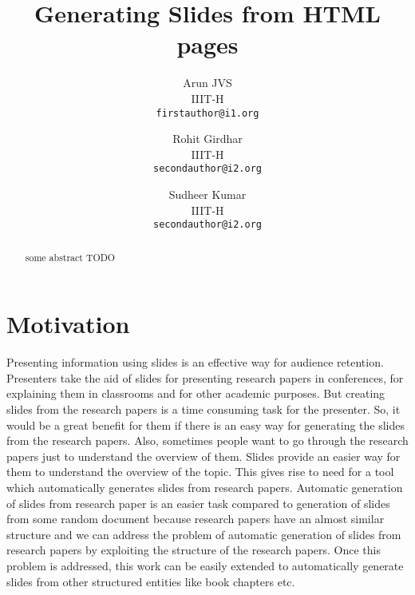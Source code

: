 \documentclass[10pt,twocolumn,letterpaper]{article}
\begin{document}
\title{Generating Slides from HTML pages}

\author{Arun JVS\\
IIIT-H\\
{\tt\small firstauthor@i1.org}
\and
Rohit Girdhar\\
IIIT-H\\
{\tt\small secondauthor@i2.org}
\and
Sudheer Kumar\\
IIIT-H\\
{\tt\small secondauthor@i2.org}
}

\maketitle

\begin{abstract}
    some abstract TODO
    \vspace{40mm}
\end{abstract}

\section{Motivation}

Presenting information using slides is an effective way for audience retention.
Presenters take the aid of slides for presenting research papers in conferences, for
explaining them in classrooms and for other academic purposes. But creating slides from
the research papers is a time consuming task for the presenter. So, it would be a great
benefit for them if there is an easy way for generating the slides from the research
papers. Also, sometimes people want to go through the research papers just to understand
the overview of them. Slides provide an easier way for them to understand the overview of
the topic. This gives rise to need for a tool which automatically generates slides from
research papers. Automatic generation of slides from research paper is an easier task
compared to generation of slides from some random document because research papers have
an almost similar structure and we can address the problem of automatic generation of slides
from research papers by exploiting the structure of the research papers. Once this problem
is addressed, this work can be easily extended to automatically generate slides from other
structured entities like book chapters etc.
\end{document}
